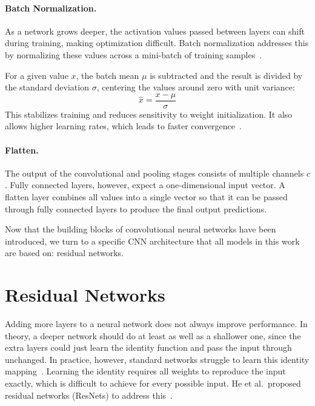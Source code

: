 \documentclass[
12pt,
fancyheadings,
a4paper,
twoside,
BCOR=0.7cm,
nobcorignoretitle,
grayscalebody,
]{stsreprt}
\begin{document}
\paragraph{Batch Normalization.}
As a network grows deeper, the activation values passed between layers can shift during training,
making optimization difficult.
Batch normalization addresses this by normalizing these values across a mini-batch of training
samples~\cite{ioffe2015batch}.

For a given value $x$, the batch mean $\mu$ is subtracted and the result is divided by the standard
deviation $\sigma$, centering the values around zero with unit variance:
\begin{equation}
\hat{x} = \frac{x - \mu}{\sigma}
\end{equation}
This stabilizes training and reduces sensitivity to weight initialization.
It also allows higher learning rates, which leads to faster convergence~\cite{ioffe2015batch}.

\paragraph{Flatten.}
The output of the convolutional and pooling stages consists of multiple channels $c$.
Fully connected layers, however, expect a one-dimensional input vector.
A flatten layer combines all values into a single vector so that it can be passed through fully
connected layers to produce the final output predictions.

Now that the building blocks of convolutional neural networks have been introduced, we turn to a
specific CNN architecture that all models in this work are based on: residual networks.

\section{Residual Networks}
\label{sec:residual_networks}

Adding more layers to a neural network does not always improve performance.
In theory, a deeper network should do at least as well as a shallower one, since the extra layers
could just learn the identity function and pass the input through unchanged.
In practice, however, standard networks struggle to learn this identity mapping~\cite{he2016deep}.
Learning the identity requires all weights to reproduce the input exactly, which is difficult to
achieve for every possible input.
He et al.\ proposed residual networks (ResNets) to address this~\cite{he2016deep}.
\end{document}
